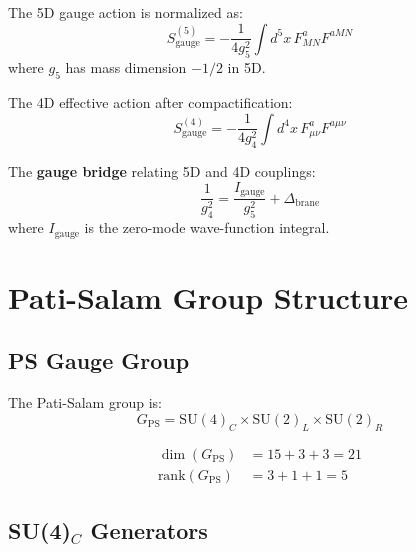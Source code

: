 \documentclass[11pt,a4paper]{article}
\theoremstyle{definition}
\begin{document}
The 5D gauge action is normalized as:
\begin{equation}
  \label{eq:5d-gauge-action}
  S_{\text{gauge}}^{(5)} = -\frac{1}{4g_5^2} \int d^5x \, F_{MN}^a F^{aMN}
\end{equation}
where $g_5$ has mass dimension $-1/2$ in 5D.

The 4D effective action after compactification:
\begin{equation}
  \label{eq:4d-gauge-action}
  S_{\text{gauge}}^{(4)} = -\frac{1}{4g_4^2} \int d^4x \, F_{\mu\nu}^a F^{a\mu\nu}
\end{equation}

The \textbf{gauge bridge} relating 5D and 4D couplings:
\begin{equation}
  \label{eq:gauge-bridge}
  \boxed{\frac{1}{g_4^2} = \frac{I_{\text{gauge}}}{g_5^2} + \Delta_{\text{brane}}}
\end{equation}
where $I_{\text{gauge}}$ is the zero-mode wave-function integral.

\newpage

\section{Pati-Salam Group Structure}
\label{sec:ps-structure}

\subsection{PS Gauge Group}
\label{subsec:ps-group}

The Pati-Salam group is:
\begin{equation}
  \label{eq:ps-group}
  G_{\text{PS}} = \text{SU}(4)_C \times \text{SU}(2)_L \times \text{SU}(2)_R
\end{equation}

\begin{canonbox}
\begin{align}
  \label{eq:ps-dim}
  \dim(G_{\text{PS}}) &= 15 + 3 + 3 = 21 \\
  \label{eq:ps-rank}
  \text{rank}(G_{\text{PS}}) &= 3 + 1 + 1 = 5
\end{align}
\end{canonbox}

\subsection{SU(4)$_C$ Generators}
\label{subsec:su4-generators}
\end{document}
